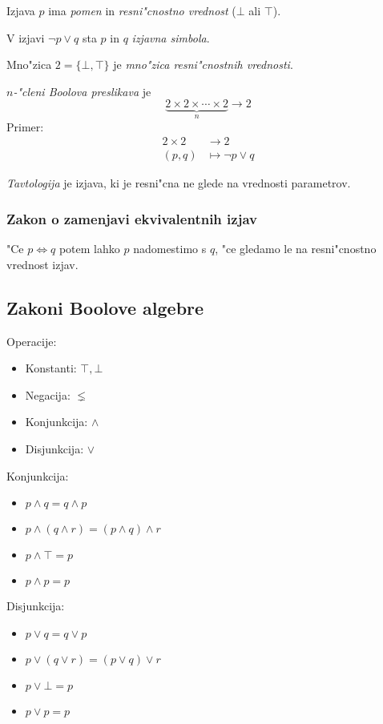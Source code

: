 Izjava $p$ ima \emph{pomen} in \emph{resni"cnostno vrednost} ($\bot$ ali $\top$).

V izjavi $\lnot p \lor q$ sta $p$ in $q$ \emph{izjavna simbola}.

Mno"zica $2 = \{\bot, \top\}$ je \emph{mno"zica resni"cnostnih vrednosti}.

\emph{$n$-"cleni Boolova preslikava} je
\begin{equation*}
\underbrace{2\times 2 \times \cdots \times 2}_{n} \rightarrow 2
\end{equation*}
Primer:
\begin{align*}
2\times 2 &\rightarrow 2\\
(p, q) &\mapsto \lnot p \lor q
\end{align*}

\emph{Tavtologija} je izjava, ki je resni"cna ne glede na vrednosti parametrov.

\subsubsection*{Zakon o zamenjavi ekvivalentnih izjav}
"Ce $p \iff q$ potem lahko $p$ nadomestimo s $q$, "ce gledamo le na resni"cnostno vrednost izjav.

\subsection{Zakoni Boolove algebre}
Operacije:
\begin{itemize}
	\item Konstanti: $\top, \bot$
	\item Negacija: $\lneq$
	\item Konjunkcija: $\land$
	\item Disjunkcija: $\lor$
\end{itemize}

Konjunkcija:
\begin{itemize}
	\item $p \land q = q \land p$
	\item $p \land (q \land r) = (p \land q) \land r$
	\item $p \land \top = p$
	\item $p \land p = p$
\end{itemize}

Disjunkcija:
\begin{itemize}
	\item $p \lor q = q \lor p$
	\item $p \lor (q \lor r) = (p \lor q) \lor r$
	\item $p \lor \bot = p$
	\item $p \lor p = p$
\end{itemize}

